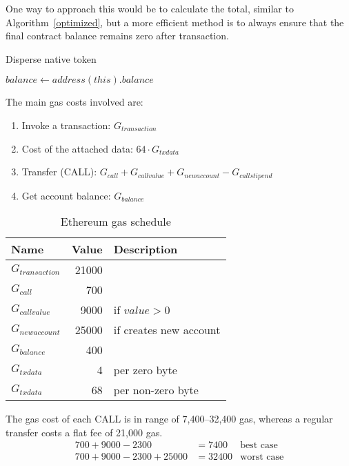 \documentclass[12pt]{article}
\begin{document}
One way to approach this would be to calculate the total, similar to Algorithm~\ref{optimized}, but a more efficient method is to always ensure that the final contract balance remains zero after transaction.

\begin{algorithm}[h]
	\label{native}
	\caption{Disperse native token}
	\BlankLine
	\For{$i \in [0 \dots recipients.length)$}{
		recipients[i].transfer(values[i])
	}
	$balance \leftarrow address(this).balance$ \\
\end{algorithm}

The main gas costs involved are:
\begin{enumerate}
	\item Invoke a transaction: $G_{transaction}$
	\item Cost of the attached data: $64 \cdot G_{txdata}$
	\item Transfer (CALL): $G_{call} + G_{callvalue} + G_{newaccount} - G_{callstipend}$
	\item Get account balance: $G_{balance}$
\end{enumerate}

\begin{table}[h]
\caption{Ethereum gas schedule}
\label{gas-costs-2}
\begin{center}
\begin{tabular}{l r l}
	Name & Value & Description \\ \hline
	$G_{transaction}$ & 21000 \\
	$G_{call}$ & 700 \\
	$G_{callvalue}$ & 9000 & if $value > 0$ \\
	$G_{newaccount}$ & 25000 & if creates new account \\
	$G_{balance}$ & 400 \\
	$G_{txdata}$ & 4 & per zero byte \\
	$G_{txdata}$ & 68 & per non-zero byte \\

\end{tabular}
\end{center}
\end{table}

The gas cost of each CALL\cite{subtleties} is in range of 7,400--32,400 gas, whereas a regular transfer costs a flat fee of 21,000 gas.
%
\begin{align*}
700 + 9000 - 2300 &= 7400 & \text{best case} \\
700 + 9000 - 2300 + 25000 &= 32400 & \text{worst case}
\end{align*}
\end{document}
